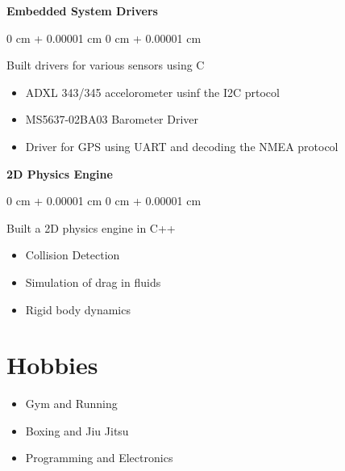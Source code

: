 \documentclass[10pt, letterpaper]{article}
\newenvironment{onecolentry}{
    \begin{adjustwidth}{
        0 cm + 0.00001 cm
    }{
        0 cm + 0.00001 cm
    }
}{
    \end{adjustwidth}
} %
\begin{document}
        \vspace{0.20cm}
        
    \textbf{Embedded System Drivers}
        \vspace{0.10 cm}
        \begin{onecolentry}
         Built drivers for various sensors using C
            \begin{itemize}
                \item ADXL 343/345 accelorometer usinf the I2C prtocol
                \item MS5637-02BA03 Barometer Driver
                \item Driver for GPS using UART and decoding the NMEA protocol
            \end{itemize}
        \end{onecolentry}

    \textbf{2D Physics Engine}
        \vspace{0.10 cm}
        \begin{onecolentry}
         Built a 2D physics engine in C++
            \begin{itemize}
                \item Collision Detection
                \item Simulation of drag in fluids
                \item Rigid body dynamics
            \end{itemize}
        \end{onecolentry}


\section{Hobbies}
    \begin{itemize}
        \item Gym and Running
        \item Boxing and Jiu Jitsu
        \item Programming and Electronics
    \end{itemize}
\end{document}
